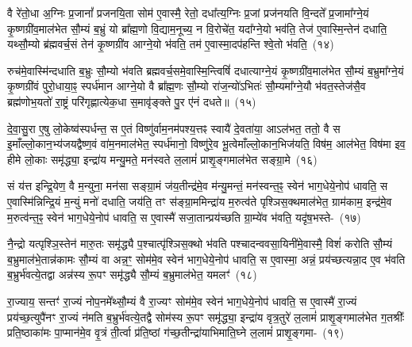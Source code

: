 वै रे॑तो॒धा अ॒ग्निः प्र॒जानां᳚ प्रजनयि॒ता सोम॑ ए॒वास्मै॒ रेतो॒ दधा᳚त्य॒ग्निः प्र॒जां प्रज॑नयति वि॒न्दते᳚ प्र॒जामा᳚ग्ने॒यं कृ॒ष्ण\-ग्री॑व॒माल॑भेत सौ॒म्यं ब॒भ्रुं यो ब्रा᳚ह्म॒णो वि॒द्याम॒नूच्य॒ न वि॒रोचे॑त॒ यदा᳚ग्ने॒यो भव॑ति॒ तेज॑ ए॒वास्मि॒न्तेन॑ दधाति॒ यथ्सौ॒म्यो ब्र॑ह्मवर्च॒सं तेन॑ कृ॒ष्णग्री॑व आग्ने॒यो भ॑वति॒ तम॑ ए॒वास्मा॒दप॑हन्ति श्वे॒तो भ॑वति॒~(१४)\ip

रुच॑मे॒वास्मि॑न्दधाति ब॒भ्रुः सौ॒म्यो भ॑वति ब्रह्मवर्च॒स\-मे॒वास्मि॒न्त्विषिं॑ दधात्याग्ने॒यं कृ॒ष्ण\-ग्री॑व॒मा\-ल॑भेत सौ॒म्यं ब॒भ्रुमा᳚ग्ने॒यं कृ॒ष्णग्री॑वं पुरो॒धाया॒ꣴ॒ स्पर्ध॑मान आग्ने॒यो वै ब्रा᳚ह्म॒णः सौ॒म्यो रा॑ज॒न्यो॑\-ऽभितः॑ सौ॒म्यमा᳚ग्ने॒यौ भ॑वत॒स्तेज॑सै॒व ब्रह्म॑णोभ॒यतो॑ रा॒ष्ट्रं परि॑\-गृह्णात्येक॒धा स॒मावृ॑ङ्क्ते पु॒र ए॑नं दधते॥~(१५)\ip

{}

दे॒वा॒सु॒रा ए॒षु लो॒केष्व॑स्पर्धन्त॒ स ए॒तं विष्णु॑र्वाम॒नम॑\-पश्य॒त्तꣴ स्वायै॑ दे॒वता॑या॒ आ\-ऽल॑भत॒ ततो॒ वै स इ॒माँल्लो॒कान॒भ्य॑\-जयद्वैष्ण॒वं वा॑म॒नमा\-ल॑भेत॒ स्पर्ध॑मानो॒ विष्णु॑रे॒व भू॒त्वेमाँल्लो॒कान॒भिज॑यति॒ विष॑म॒ आ\-ल॑भेत॒ विष॑मा इव॒ हीमे लो॒काः समृ॑द्ध्या॒ इन्द्रा॑य मन्यु॒मते॒ मन॑स्वते ल॒लामं॑ प्राशृ॒ङ्गमाल॑भेत सङ्ग्रा॒मे~(१६)\ip

सं य॑त्त इन्द्रि॒येण॒ वै म॒न्युना॒ मन॑सा सङ्ग्रा॒मं ज॑य॒तीन्द्र॑मे॒व म॑न्यु॒मन्तं॒ मन॑स्वन्त॒ꣴ॒ स्वेन॑ भाग॒\-धेये॒नोप॑ धावति॒ स ए॒वास्मि॑न्निन्द्रि॒यं म॒न्युं मनो॑ दधाति॒ जय॑ति॒ तꣳ स॑ङ्ग्रा॒ममिन्द्रा॑य म॒रुत्व॑ते पृश्ञिस॒क्थमा\-ल॑भेत॒ ग्राम॑काम॒ इन्द्र॑मे॒व म॒रुत्व॑न्त॒ꣴ॒ स्वेन॑ भाग॒\-धेये॒नोप॑ धावति॒ स ए॒वास्मै॑ सजा॒तान्प्रय॑च्छति ग्रा॒म्ये॑व भ॑वति॒ यदृ॑ष॒भस्ते-~(१७)\ip

नै॒न्द्रो यत्पृश्ञि॒स्तेन॑ मारु॒तः समृ॑द्ध्यै प॒श्चात्पृ॑श्ञिस॒क्थो भ॑वति पश्चादन्ववसा॒यिनी॑\-मे॒वा\-स्मै॒ विशं॑ करोति सौ॒म्यं ब॒भ्रुमाल॑भे॒तान्न॑कामः सौ॒म्यं वा अन्न॒ꣳ॒ सोम॑मे॒व स्वेन॑ भाग॒\-धेये॒नोप॑ धावति॒ स ए॒वास्मा॒ अन्नं॒ प्रय॑च्छत्यन्ना॒द ए॒व भ॑वति ब॒भ्रुर्भ॑वत्ये॒तद्वा अन्न॑स्य रू॒पꣳ समृ॑द्ध्यै सौ॒म्यं ब॒भ्रुमा\-ल॑भेत॒ यमलꣳ॑~(१८)\ip

रा॒ज्याय॒ सन्तꣳ॑ रा॒ज्यं नोप॒नमे᳚थ्सौ॒म्यं वै रा॒ज्यꣳ सोम॑मे॒व स्वेन॑ भाग॒\-धेये॒नोप॑ धावति॒ स ए॒वास्मै॑ रा॒ज्यं प्रय॑च्छ॒त्युपै॑नꣳ रा॒ज्यं न॑मति ब॒भ्रुर्भ॑वत्ये॒तद्वै सोम॑स्य रू॒पꣳ समृ॑द्ध्या॒ इन्द्रा॑य वृत्र॒तुरे॑ ल॒लामं॑ प्राशृ॒ङ्गमाल॑भेत ग॒तश्रीः᳚ प्रति॒ष्ठाका॑मः पा॒प्मान॑मे॒व वृ॒त्रं ती॒र्त्वा प्र॑ति॒ष्ठां ग॑च्छ॒तीन्द्रा॑याभिमाति॒घ्ने ल॒लामं॑ प्राशृ॒ङ्गमा-~(१९)\ip

